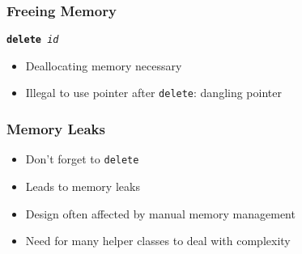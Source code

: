 \begin{frame}
  \frametitle{Freeing Memory}
  \begin{center}
    \tt {\bfseries delete} {\it id}
  \end{center}
  \begin{itemize}
    \item Deallocating memory necessary
    \item Illegal to use pointer after {\tt delete}: dangling pointer
  \end{itemize}
  \vskip5mm
\end{frame}

\begin{frame}
  \frametitle{Memory Leaks}
  \begin{itemize}
    \item Don't forget to \texttt{delete}
    \item Leads to memory leaks
    \item Design often affected by manual memory management
    \item Need for many helper classes to deal with complexity
  \end{itemize}
\end{frame}




